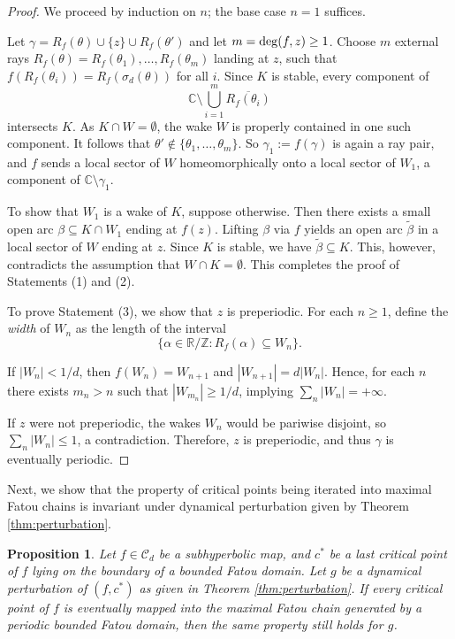 \documentclass[a4paper,reqno,times, 11pt]{amsart}
\newtheorem{proposition}[theorem]{Proposition}
\theoremstyle{remark}
\theoremstyle{plain}
\numberwithin{equation}{section}
\def\CCCC{\mathscr C}
\def\g{\gamma}
\def\C{\mbox{$\mathbb C$}}
\def\ov{\overline}
\begin{document}
\begin{proof}
	We proceed by induction on $n$; the base case $n=1$ suffices.
	
	Let $\g=R_f(\theta)\cup\{z\}\cup R_f(\theta')$ and let $m={\rm deg}(f, z)\geq 1$. Choose $m$ external rays $R_f(\theta)=R_f(\theta_1),\ldots,R_f(\theta_m)$ landing at $z$, such that $f(R_f(\theta_i))=R_f(\sigma_d(\theta))$ for all $i$. Since $K$ is stable, every component of $$\C\setminus\bigcup_{i=1}^m \ov{R_f(\theta_i)}$$ intersects $K$.  As $K\cap W=\emptyset$, the wake $W$ is properly contained in one such component. It follows that $\theta'\notin\{\theta_1,\ldots, \theta_m\}$. So $\g_1:=f(\g)$ is again a ray pair, and $f$ sends a local sector of $W$ homeomorphically onto a local sector of $W_1$,  a component of $\C\setminus\g_1$.
	
	To show that $W_1$ is a wake of $K$, suppose otherwise. Then there exists a small open arc $\beta\subseteq K\cap W_1$ ending at $f(z)$. Lifting $\beta$ via $f$ yields an open arc $\tilde{\beta}$ in a local sector of $W$ ending at $z$. Since $K$ is stable, we have $\tilde{\beta}\subseteq K$. This, however, contradicts the assumption that $W\cap K=\emptyset$. This completes the proof of Statements (1) and (2).
	
	To prove Statement (3), we show that $z$ is preperiodic.  For each $n\geq1$, define the \emph{width} of $W_n$ as the length of the interval $$\{\alpha\in\mathbb{R}/\mathbb{Z}: R_f(\alpha)\subseteq W_n\}.$$
	
	If $|W_n|<1/d$, then $f(W_n)=W_{n+1}$ and $|W_{n+1}|=d|W_n|$. Hence, for each $n$ there exists $m_n>n$ such that $|W_{m_n}|\geq 1/d$, implying $\sum\limits_{n}|W_n|=+\infty$.
	
	
	If $z$ were not preperiodic, the wakes $W_n$ would be pariwise disjoint, so $\sum_{n}|W_n|\leq 1$, a contradiction. Therefore, $z$ is preperiodic, and thus $\g$ is eventually periodic.
\end{proof}
Next, we show that the property of critical points being iterated into maximal Fatou chains is invariant under dynamical perturbation given by Theorem  \ref{thm:perturbation}.
\begin{proposition}\label{pro:same}
	Let $f\in\CCCC_d$ be a subhyperbolic map, and $c^*$ be a last critical point of $f$ lying on the boundary of a bounded Fatou domain. Let $g$ be a dynamical perturbation of $(f,c^*)$ as given in Theorem \ref{thm:perturbation}. If every critical point of $f$ is eventually mapped into the maximal Fatou chain generated by a periodic bounded Fatou domain, then the same property still holds for $g$.
\end{proposition}
\end{document}
